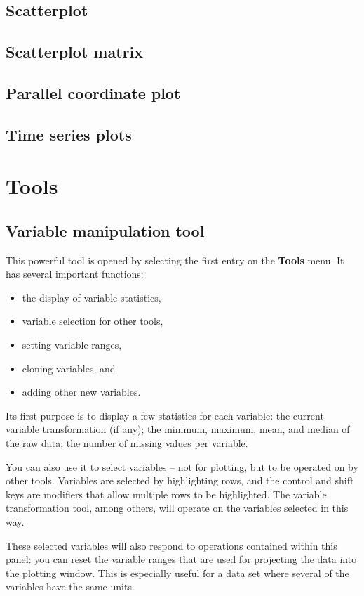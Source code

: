\documentclass[11pt]{article}
\begin{document}
\subsection{Scatterplot}
\subsection{Scatterplot matrix}
\subsection{Parallel coordinate plot}
\subsection{Time series plots}

\newpage
\section{Tools}
\subsection{Variable manipulation tool}
\label{slbl:VarManip}

This powerful tool is opened by selecting the first entry on the
{\bf Tools} menu.  It has several important functions:
\begin{itemize}
\itemsep 0em
\item the display of variable statistics,
\item variable selection for other tools,
\item setting variable ranges,
\item cloning variables, and
\item adding other new variables.
\end{itemize}

Its first purpose is to display a few statistics for each variable:
the current variable transformation (if any); the minimum, maximum,
mean, and median of the raw data; the number of missing values per variable.

You can also use it to select variables -- not for plotting, but to
be operated on by other tools.  Variables are selected by highlighting
rows, and the control and shift keys are modifiers that allow multiple
rows to be highlighted.  The variable transformation tool, among
others, will operate on the variables selected in this way.

These selected variables will also respond to operations contained
within this panel:  you can reset the variable ranges that are used
for projecting the data into the plotting window.  This is especially
useful for a data set where several of the variables have the same units.
\end{document}
